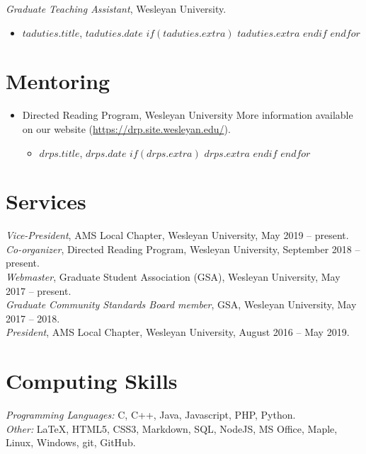 \documentclass[10pt]{res}
\newcommand{\bigsection}[1]{\section{\large{#1}}}
\begin{document}
\begin{resume}
{\sl Graduate Teaching Assistant}, Wesleyan University. \\
\begin{itemize}
  $for(taduties)$
    \item $taduties.title$, $taduties.date$
    $if(taduties.extra)$
      \subitem $taduties.extra$
    $endif$
  $endfor$
\end{itemize}

\bigsection{Mentoring}

\begin{itemize}
  \item Directed Reading Program, Wesleyan University
  \subitem More information available on our website (\href{https://drp.site.wesleyan.edu/}{https://drp.site.wesleyan.edu/}).
  \begin{itemize}
    $for(drps)$
      \item $drps.title$, $drps.date$
      $if(drps.extra)$
        \subitem $drps.extra$
      $endif$
    $endfor$
  \end{itemize}
\end{itemize}

\bigsection{Services}

{\sl Vice-President}, AMS Local Chapter, Wesleyan University, May 2019 -- present. \\
{\sl Co-organizer}, Directed Reading Program, Wesleyan University, September 2018 -- present. \\
{\sl Webmaster}, Graduate Student Association (GSA), Wesleyan University, May 2017 -- present. \\
{\sl Graduate Community Standards Board member}, GSA, Wesleyan University, May 2017 -- 2018. \\
{\sl President}, AMS Local Chapter, Wesleyan University, August 2016 -- May 2019. \\

\bigsection{Computing Skills}

{\sl Programming Languages: }
C, C++, Java, Javascript, PHP, Python. \\
{\sl Other: }
LaTeX, HTML5, CSS3, Markdown,
SQL, NodeJS,
MS Office, Maple,
Linux, Windows,
git, GitHub.

\end{resume}
\end{document}
